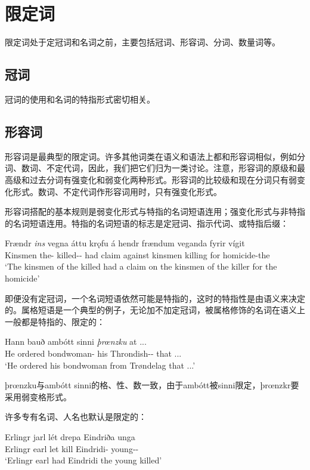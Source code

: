 \section{限定词}

限定词处于定冠词和名词之前，主要包括冠词、形容词、分词、数量词等。
\subsection{冠词}

冠词的使用和名词的特指形式密切相关。
\subsection{形容词}

形容词是最典型的限定词。许多其他词类在语义和语法上都和形容词相似，例如分词、数词、不定代词，因此，我们把它们归为一类讨论。注意，形容词的原级和最高级和过去分词有强变化和弱变化两种形式。形容词的比较级和现在分词只有弱变化形式。数词、不定代词作形容词用时，只有强变化形式。

形容词搭配的基本规则是弱变化形式与特指的名词短语连用；强变化形式与非特指的名词短语连用。特指的名词短语的标志是定冠词、指示代词、或特指后缀：
\begin{exe}
    \ex \gll
    Frændr \textit{ins} vegna áttu kr\k{o}fu {á hendr} frændum veganda fyrir vígit\\
    Kinsmen the-{\gen} killed-{\DEF}-{\gen} had claim against kinsmen killing for homicide-{the}\\
    \trans `The kinsmen of the killed had a claim on the kinsmen of the killer for the homicide'
\end{exe}

即便没有定冠词，一个名词短语依然可能是特指的，这时的特指性是由语义来决定的。属格短语是一个典型的例子，无论加不加定冠词，被属格修饰的名词在语义上一般都是特指的、限定的：
\begin{exe}
    \ex \gll  Hann bauð ambótt sinni \textit{þrœnzku} at ...\\
    He ordered bondwoman-{\dat} his Throndish-{\DEF}-{\dat} that ...\\
    \trans `He ordered his bondwoman from Trøndelag that ...'
\end{exe}

þrœnzku与ambótt sinni的格、性、数一致，由于ambótt被sinni限定，þrœnzkr要采用弱变格形式。

许多专有名词、人名也默认是限定的：
\begin{exe}
    \ex \gll  Erlingr jarl lét drepa Eindriða unga\\
    Erlingr earl let kill Eindridi-{\acc} young-{\DEF}-{\acc}\\
    \trans `Erlingr earl had Eindridi the young killed'
\end{exe}


